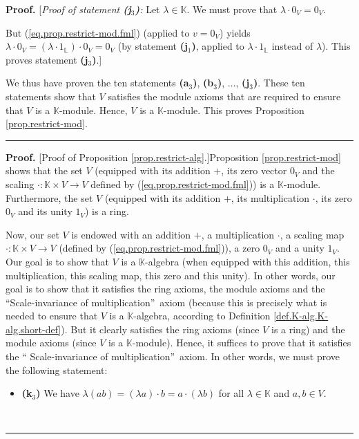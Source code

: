 \documentclass[numbers=enddot,12pt,final,onecolumn,notitlepage]{scrartcl}%
\theoremstyle{definition}
\newenvironment{fineprint}{\begin{small}}{\end{small}}
\newenvironment{proof}[1][Proof]{\noindent\textbf{#1.} }{\ \rule{0.5em}{0.5em}}
\begin{document}
\begin{fineprint}
\begin{proof}
[\textit{Proof of statement \textbf{(j}}$_{3}$\textit{\textbf{)}:} Let
$\lambda\in\mathbb{K}$. We must prove that $\lambda\cdot0_{V}=0_{V}$.

But (\ref{eq.prop.restrict-mod.fml}) (applied to $v=0_{V}$) yields
$\lambda\cdot0_{V}=\left(  \lambda\cdot1_{\mathbb{L}}\right)  \cdot0_{V}%
=0_{V}$ (by statement \textbf{(j}$_{1}$\textbf{)}, applied to $\lambda
\cdot1_{\mathbb{L}}$ instead of $\lambda$). This proves statement
\textbf{(j}$_{3}$\textbf{)}.]

We thus have proven the ten statements \textbf{(a}$_{3}$\textbf{)},
\textbf{(b}$_{3}$\textbf{)}, $\ldots$, \textbf{(j}$_{3}$\textbf{)}. These ten
statements show that $V$ satisfies the module axioms that are required to
ensure that $V$ is a $\mathbb{K}$-module. Hence, $V$ is a $\mathbb{K}$-module.
This proves Proposition \ref{prop.restrict-mod}.
\end{proof}

\begin{proof}
[Proof of Proposition \ref{prop.restrict-alg}.]Proposition
\ref{prop.restrict-mod} shows that the set $V$ (equipped with its addition
$+$, its zero vector $0_{V}$ and the scaling $\cdot:\mathbb{K}\times
V\rightarrow V$ defined by (\ref{eq.prop.restrict-mod.fml})) is a $\mathbb{K}%
$-module. Furthermore, the set $V$ (equipped with its addition $+$, its
multiplication $\cdot$, its zero $0_{V}$ and its unity $1_{V}$) is a ring.

Now, our set $V$ is endowed with an addition $+$, a multiplication $\cdot$, a
scaling map $\cdot:\mathbb{K}\times V\rightarrow V$ (defined by
(\ref{eq.prop.restrict-mod.fml})), a zero $0_{V}$ and a unity $1_{V}$. Our
goal is to show that $V$ is a $\mathbb{K}$-algebra (when equipped with this
addition, this multiplication, this scaling map, this zero and this unity). In
other words, our goal is to show that it satisfies the ring axioms, the module
axioms and the \textquotedblleft Scale-invariance of
multiplication\textquotedblright\ axiom (because this is precisely what is
needed to ensure that $V$ is a $\mathbb{K}$-algebra, according to Definition
\ref{def.K-alg.K-alg.short-def}). But it clearly satisfies the ring axioms
(since $V$ is a ring) and the module axioms (since $V$ is a $\mathbb{K}%
$-module). Hence, it suffices to prove that it satisfies the \textquotedblleft
Scale-invariance of multiplication\textquotedblright\ axiom. In other words,
we must prove the following statement:

\begin{itemize}
\item \textbf{(k}$_{3}$\textbf{)} We have $\lambda\left(  ab\right)  =\left(
\lambda a\right)  \cdot b=a\cdot\left(  \lambda b\right)  $ for all
$\lambda\in\mathbb{K}$ and $a,b\in V$.
\end{itemize}


\end{proof}
\end{fineprint}
\end{document}

